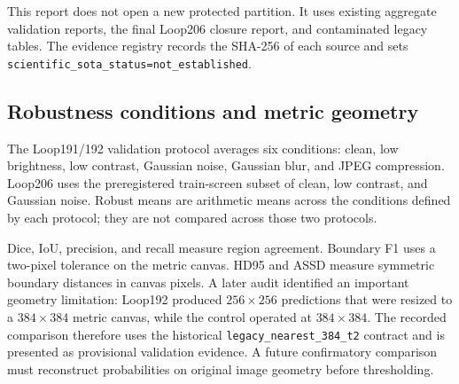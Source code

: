 This report does not open a new protected partition. It uses existing aggregate validation reports, the final Loop206 closure report, and contaminated legacy tables. The evidence registry records the SHA-256 of each source and sets \texttt{scientific\_sota\_status=not\_established}.

\subsection{Robustness conditions and metric geometry}

The Loop191/192 validation protocol averages six conditions: clean, low brightness, low contrast, Gaussian noise, Gaussian blur, and JPEG compression. Loop206 uses the preregistered train-screen subset of clean, low contrast, and Gaussian noise. Robust means are arithmetic means across the conditions defined by each protocol; they are not compared across those two protocols.

Dice, IoU, precision, and recall measure region agreement. Boundary F1 uses a two-pixel tolerance on the metric canvas. HD95 and ASSD measure symmetric boundary distances in canvas pixels. A later audit identified an important geometry limitation: Loop192 produced $256\times256$ predictions that were resized to a $384\times384$ metric canvas, while the control operated at $384\times384$. The recorded comparison therefore uses the historical \texttt{legacy\_nearest\_384\_t2} contract and is presented as provisional validation evidence. A future confirmatory comparison must reconstruct probabilities on original image geometry before thresholding.
